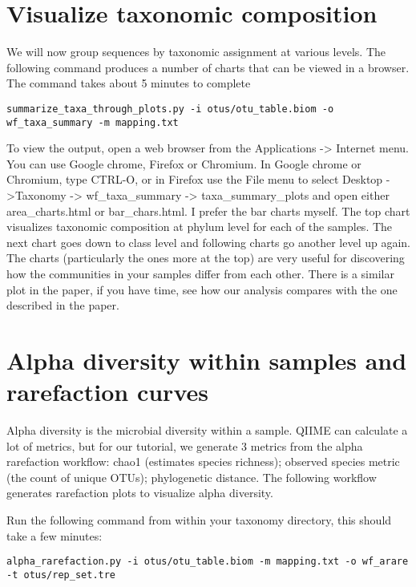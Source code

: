 \section{Visualize taxonomic composition}
We will now group sequences by taxonomic assignment at various levels. The following command produces a number of charts that can be viewed in a browser. The command takes about 5 minutes to complete


\begin{steps}

\begin{lstlisting}[style=command_syntax]
summarize_taxa_through_plots.py -i otus/otu_table.biom -o  wf_taxa_summary -m mapping.txt 

\end{lstlisting}
\end{steps}

\begin{steps}
To view the output, open a web browser from the Applications -> Internet menu. You can use Google chrome, Firefox or Chromium.
In Google chrome or Chromium, type CTRL-O, or in Firefox use the File menu to select Desktop ->Taxonomy -> wf_taxa_summary -> taxa_summary_plots and open either area_charts.html or bar_chars.html. I prefer the bar charts myself. The top chart visualizes taxonomic composition at phylum level for each of the samples. The next chart goes down to class level and following charts go another level up again. The charts (particularly the ones more at the top) are very useful for discovering how the communities in your samples differ from each other. There is a similar plot in the paper, if you have time, see how our analysis compares with the one described in the paper.

\end{steps}

\section{Alpha diversity within samples and rarefaction curves}

Alpha diversity is the microbial diversity within a sample. QIIME can calculate a lot of metrics, but for our tutorial, we generate 3 metrics from the alpha rarefaction workflow: chao1 (estimates species richness); observed species metric (the count of unique OTUs); phylogenetic distance. The following workflow generates rarefaction plots to visualize alpha diversity.

\begin{steps}
Run the following command from within your taxonomy directory, this should take a few minutes:
\begin{lstlisting}
alpha_rarefaction.py -i otus/otu_table.biom -m mapping.txt -o wf_arare -t otus/rep_set.tre
\end{lstlisting}
\end{steps}

